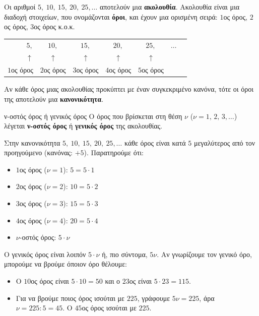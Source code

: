 

Οι αριθμοί $5,\ 10,\ 15,\ 20,\ 25,\dots$ αποτελούν μια \textbf{ακολουθία}. Ακολουθία είναι μια διαδοχή στοιχείων, που ονομάζονται \textbf{όροι}, και έχουν μια ορισμένη σειρά: $1$ος όρος, $2$ος όρος, $3$ος όρος κ.ο.κ.

\begin{center}
\renewcommand{\arraystretch}{1.3}
\begin{tabular}{rcccccc}
$5,$ & $10,$ & $15,$ & $20,$ & $25,$ & $\dots$\\
$\uparrow$ & $\uparrow$ & $\uparrow$ & $\uparrow$ & $\uparrow$ & \\
{\small $1$ος όρος} & {\small $2$ος όρος} & {\small $3$ος όρος} & {\small $4$ος όρος} & {\small $5$ος όρος} &
\end{tabular}
\end{center}

Αν κάθε όρος μιας ακολουθίας προκύπτει με έναν συγκεκριμένο κανόνα, τότε οι όροι της αποτελούν μια \textbf{κανονικότητα}.

\begin{orismos}{ν-οστός όρος ή γενικός όρος}
Ο όρος που βρίσκεται στη θέση $\nu$ ($\nu=1,\,2,\,3,\dots$) λέγεται \textbf{ν-οστός όρος} ή \textbf{γενικός όρος} της ακολουθίας.
\end{orismos}


Στην κανονικότητα $5,\ 10,\ 15,\ 20,\ 25,\dots$ κάθε όρος είναι κατά $5$ μεγαλύτερος από τον προηγούμενο (κανόνας: $+5$). Παρατηρούμε ότι:
\begin{itemize}[leftmargin=1.2em,itemsep=0.3ex,topsep=2pt]
\item $1$ος όρος ($\nu=1$): $5=5\cdot1$
\item $2$ος όρος ($\nu=2$): $10=5\cdot2$
\item $3$ος όρος ($\nu=3$): $15=5\cdot3$
\item $4$ος όρος ($\nu=4$): $20=5\cdot4$
\item $\nu$-οστός όρος: $5\cdot\nu$
\end{itemize}

Ο γενικός όρος είναι λοιπόν $5\cdot\nu$ ή, πιο σύντομα, $5\nu$. Αν γνωρίζουμε τον γενικό όρο, μπορούμε να βρούμε όποιον όρο θέλουμε:
\begin{itemize}[leftmargin=1.2em,itemsep=0.3ex,topsep=2pt]
\item Ο $10$ος όρος είναι $5\cdot10=50$ και ο $23$ος είναι $5\cdot23=115$.
\item Για να βρούμε ποιος όρος ισούται με $225$, γράφουμε $5\nu=225$, άρα $\nu=225:5=45$. Ο $45$ος όρος ισούται με $225$.
\end{itemize}

